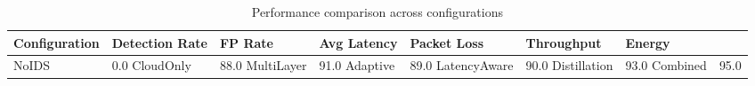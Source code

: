 \begin{table}
\caption{Performance comparison across configurations}
\label{tab:results}
\begin{tabular}{lllllll}
\toprule
Configuration & Detection Rate & FP Rate & Avg Latency & Packet Loss & Throughput & Energy \\
\midrule
NoIDS & 0.0%
CloudOnly & 88.0%
MultiLayer & 91.0%
Adaptive & 89.0%
LatencyAware & 90.0%
Distillation & 93.0%
Combined & 95.0%
\bottomrule
\end{tabular}
\end{table}
